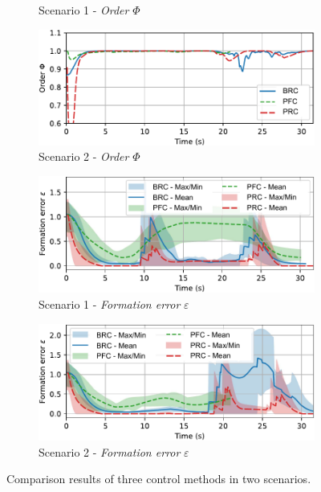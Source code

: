 \begin{figure}
\begin{subfigure}[b]{0.495\textwidth}
    \caption{Scenario 1 - \textit{Order} $\Phi$}
    \label{fig:order1}
    \end{subfigure}
    \begin{subfigure}[b]{0.495\textwidth}
    \includegraphics[width=\textwidth]{paper3/images/order_scen2.pdf}
    \caption{Scenario 2 - \textit{Order} $\Phi$}
    \label{fig:order2}
    \end{subfigure}
    \begin{subfigure}[b]{0.495\textwidth}
    \includegraphics[width=\textwidth]{paper3/images/error_scen1.pdf}
    \caption{Scenario 1 - \textit{Formation error} $\varepsilon$}
    \label{fig:error1}
    \end{subfigure}
    \begin{subfigure}[b]{0.495\textwidth}
    \includegraphics[width=\textwidth]{paper3/images/error_scen2.pdf}
    \caption{Scenario 2 - \textit{Formation error} $\varepsilon$}
    \label{fig:errorr2}
    \end{subfigure}
    \caption{Comparison results of three control methods in two scenarios.}
    \label{fig:comparison}
\end{figure}

